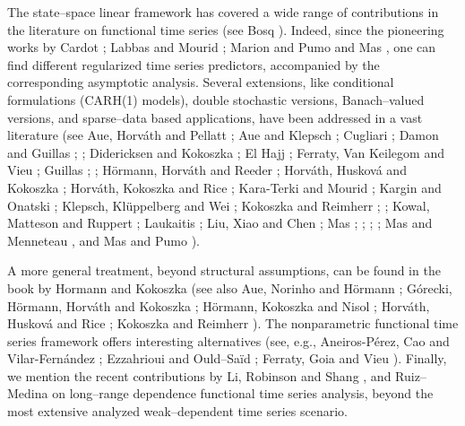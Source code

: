 \documentclass[11pt,a4paper]{article}
\begin{document}
The state--space linear framework has covered a wide range of contributions in the literature on functional time series (see Bosq \cite{Bosq00}).  Indeed, since the pioneering works
by   Cardot \cite{Cardot98};  Labbas and Mourid \cite{LabbasMourid02}; Marion and  Pumo  \cite{MarionPumo04} and  Mas \cite{Mas99}, one can find different regularized   time series predictors, accompanied by the corresponding asymptotic analysis. Several  extensions, like conditional formulations (CARH(1) models), double stochastic versions,  Banach--valued  versions, and sparse--data based applications, have been addressed in a vast literature (see   Aue, Horv\'ath and Pellatt \cite{Aueetal17}; Aue and Klepsch \cite{AueKlepsch17};
Cugliari \cite{Cugliari13}; Damon and Guillas
\cite{DamonGuillas02}; \cite{DamonGuillas05};  Didericksen and  Kokoszka \cite{Didericksen12};    El Hajj \cite{ElHajj}; Ferraty,  Van Keilegom  and Vieu \cite{FerratyVieu12};
Guillas \cite{Guillas01};
\cite{Guillas02};  H\"ormann, Horv\'ath and Reeder \cite{Hormannetal13}; Horv\'ath, Huskov\'a   and  Kokoszka
\cite{Huskova10};   Horv\'ath, Kokoszka and Rice \cite{Horvathetal14}; Kara-Terki and Mourid \cite{Kara16}; Kargin and Onatski \cite{KarginOnatski08};
 Klepsch, Klüppelberg and Wei \cite{Klepschetal17};
Kokoszka  and Reimherr  \cite{KokoszkaReimherr13}; \cite{KokoszkaReimherr13b}; Kowal, Matteson  and  Ruppert \cite{KowalMattesonRuppert13b};
Laukaitis \cite{Laukaitis08};
Liu,   Xiao and  Chen \cite{Liutal16};   Mas \cite{Mas00}; \cite{Mas02}; \cite{Mas04}; \cite{Mas07};
  Mas and Menneteau \cite{MasMenneteau03},  and Mas and Pumo \cite{MasPumo07}).

  A more general treatment,  beyond structural assumptions,  can be found in the book by Hormann  and Kokoszka \cite{HormannKokoszka12}  (see also Aue, Norinho and H\"ormann \cite{Aueetal15};  G\'orecki, H\"ormann, Horv\'ath and Kokoszka \cite{Goreckietal18};
H\"ormann, Kokoszka and Nisol  \cite{Hormannetal18}; Horv\'ath, Huskov\'a and  Rice  \cite{Horvathetal13};
   Kokoszka  and  Reimherr \cite{KokoszkaReimherr13}).  The nonparametric  functional time series framework offers interesting alternatives (see, e.g.,   Aneiros-P\'erez,  Cao  and Vilar-Fern\'andez \cite{Aneiros11};   Ezzahrioui  and  Ould--Sa{\"i}d  \cite{Ezzahrioui};   Ferraty,  Goia and  Vieu \cite{FerratyGoia02}).  Finally, we mention the  recent contributions  by Li,  Robinson and Shang \cite{Lietal20}, and  Ruiz--Medina \cite{RuizMedina19} on  long--range dependence functional time series analysis,  beyond the most extensive analyzed  weak--dependent time series scenario.
\end{document}

